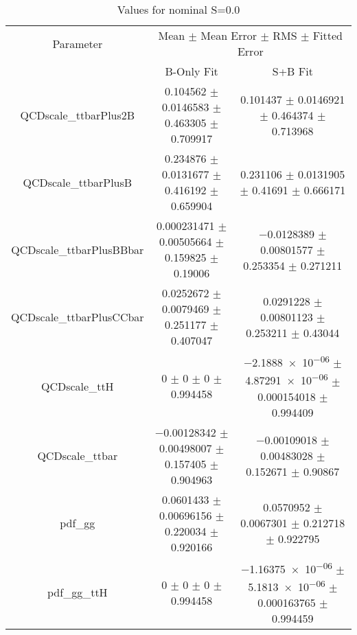 \begin{table}
\centering
\caption{Values for nominal S=0.0}
\begin{tabular}{ccc}
\toprule
Parameter & \multicolumn{2}{c}{Mean $\pm$ Mean Error $\pm$ RMS $\pm$ Fitted Error}\\
 & B-Only Fit & S+B Fit\\
\midrule
QCDscale\_ttbarPlus2B & \num{0.104562} $\pm$ \num{0.0146583} $\pm$ \num{0.463305} $\pm$ \num{0.709917} & \num{0.101437} $\pm$ \num{0.0146921} $\pm$ \num{0.464374} $\pm$ \num{0.713968}\\
QCDscale\_ttbarPlusB & \num{0.234876} $\pm$ \num{0.0131677} $\pm$ \num{0.416192} $\pm$ \num{0.659904} & \num{0.231106} $\pm$ \num{0.0131905} $\pm$ \num{0.41691} $\pm$ \num{0.666171}\\
QCDscale\_ttbarPlusBBbar & \num{0.000231471} $\pm$ \num{0.00505664} $\pm$ \num{0.159825} $\pm$ \num{0.19006} & \num{-0.0128389} $\pm$ \num{0.00801577} $\pm$ \num{0.253354} $\pm$ \num{0.271211}\\
QCDscale\_ttbarPlusCCbar & \num{0.0252672} $\pm$ \num{0.0079469} $\pm$ \num{0.251177} $\pm$ \num{0.407047} & \num{0.0291228} $\pm$ \num{0.00801123} $\pm$ \num{0.253211} $\pm$ \num{0.43044}\\
QCDscale\_ttH & \num{0} $\pm$ \num{0} $\pm$ \num{0} $\pm$ \num{0.994458} & \num{-2.1888e-06} $\pm$ \num{4.87291e-06} $\pm$ \num{0.000154018} $\pm$ \num{0.994409}\\
QCDscale\_ttbar & \num{-0.00128342} $\pm$ \num{0.00498007} $\pm$ \num{0.157405} $\pm$ \num{0.904963} & \num{-0.00109018} $\pm$ \num{0.00483028} $\pm$ \num{0.152671} $\pm$ \num{0.90867}\\
pdf\_gg & \num{0.0601433} $\pm$ \num{0.00696156} $\pm$ \num{0.220034} $\pm$ \num{0.920166} & \num{0.0570952} $\pm$ \num{0.0067301} $\pm$ \num{0.212718} $\pm$ \num{0.922795}\\
pdf\_gg\_ttH & \num{0} $\pm$ \num{0} $\pm$ \num{0} $\pm$ \num{0.994458} & \num{-1.16375e-06} $\pm$ \num{5.1813e-06} $\pm$ \num{0.000163765} $\pm$ \num{0.994459}\\
\bottomrule
\end{tabular}
\end{table}